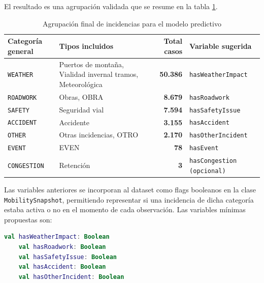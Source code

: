 El resultado es una agrupación validada que se resume en la tabla \ref{tab:agrupacion_incidencias}.

\begin{table}[H]
	\centering
	\caption{Agrupación final de incidencias para el modelo predictivo}
	\label{tab:agrupacion_incidencias}
	\renewcommand{\arraystretch}{1.3}
	\begin{tabularx}{\textwidth}{lXrX}
		\toprule
		\textbf{Categoría general} & \textbf{Tipos incluidos} & \textbf{Total casos} & \textbf{Variable sugerida} \\
		\midrule
		\texttt{WEATHER}    & Puertos de montaña, Vialidad invernal tramos, Meteorológica & \textbf{50.386} & \texttt{hasWeatherImpact} \\
		\texttt{ROADWORK}   & Obras, OBRA                                                  & \textbf{8.679}  & \texttt{hasRoadwork} \\
		\texttt{SAFETY}     & Seguridad vial                                               & \textbf{7.594}  & \texttt{hasSafetyIssue} \\
		\texttt{ACCIDENT}   & Accidente                                                    & \textbf{3.155}  & \texttt{hasAccident} \\
		\texttt{OTHER}      & Otras incidencias, OTRO                                      & \textbf{2.170}  & \texttt{hasOtherIncident} \\
		\texttt{EVENT}      & EVEN                                                         & \textbf{78}     & \texttt{hasEvent} \\
		\texttt{CONGESTION} & Retención                                                    & \textbf{3}      & \texttt{hasCongestion (opcional)} \\
		\bottomrule
	\end{tabularx}
\end{table}

Las variables anteriores se incorporan al dataset como flags booleanos en la clase \texttt{MobilitySnapshot}, permitiendo representar si una incidencia de dicha categoría estaba activa o no en el momento de cada observación. Las variables mínimas propuestas son:

\begin{lstlisting}[language=Kotlin, caption={Variables mínimas de incidencias en MobilitySnapshot}]
	val hasWeatherImpact: Boolean
	val hasRoadwork: Boolean
	val hasSafetyIssue: Boolean
	val hasAccident: Boolean
	val hasOtherIncident: Boolean
\end{lstlisting}

